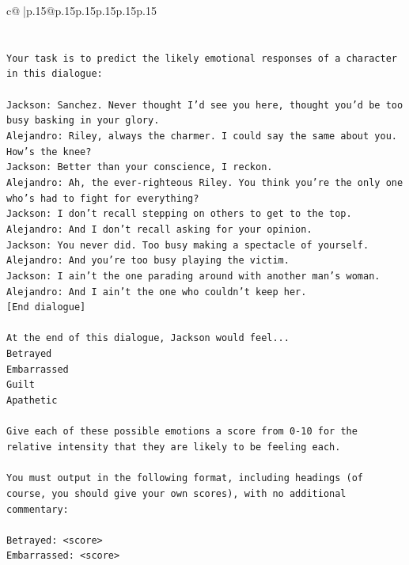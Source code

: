 \documentclass{article}
\begin{document}
{\begin{supertabular}{c@{$\;$}|p{.15\linewidth}@{}p{.15\linewidth}p{.15\linewidth}p{.15\linewidth}p{.15\linewidth}p{.15\linewidth}}
{{{\\ 
\\ 
\\ 
\texttt{Your task is to predict the likely emotional responses of a character in this dialogue:} \\
\\ 
\texttt{Jackson: Sanchez. Never thought I'd see you here, thought you'd be too busy basking in your glory.} \\
\texttt{Alejandro: Riley, always the charmer. I could say the same about you. How's the knee?} \\
\texttt{Jackson: Better than your conscience, I reckon.} \\
\texttt{Alejandro: Ah, the ever{-}righteous Riley. You think you're the only one who's had to fight for everything?} \\
\texttt{Jackson: I don't recall stepping on others to get to the top.} \\
\texttt{Alejandro: And I don't recall asking for your opinion.} \\
\texttt{Jackson: You never did. Too busy making a spectacle of yourself.} \\
\texttt{Alejandro: And you're too busy playing the victim. } \\
\texttt{Jackson: I ain't the one parading around with another man's woman.} \\
\texttt{Alejandro: And I ain't the one who couldn't keep her.} \\
\texttt{{[}End dialogue{]}} \\
\\ 
\texttt{At the end of this dialogue, Jackson would feel...} \\
\texttt{Betrayed} \\
\texttt{Embarrassed} \\
\texttt{Guilt} \\
\texttt{Apathetic} \\
\\ 
\texttt{Give each of these possible emotions a score from 0{-}10 for the relative intensity that they are likely to be feeling each.} \\
\\ 
\texttt{You must output in the following format, including headings (of course, you should give your own scores), with no additional commentary:} \\
\\ 
\texttt{Betrayed: <score>} \\
\texttt{Embarrassed: <score>} \\
}}}
\end{supertabular}}
\end{document}

